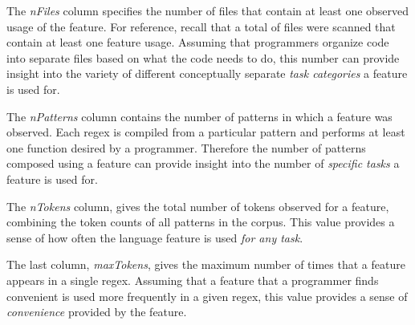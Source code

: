 The \emph{nFiles} column specifies the number of files that contain at least one observed usage of the feature.  For reference, recall that a total of  files were scanned that contain at least one feature usage.  Assuming that programmers organize code into separate files based on what the code needs to do, this number can provide insight into the variety of different conceptually separate \emph{task categories} a feature is used for.

The \emph{nPatterns} column contains the number of patterns in which a feature was observed. Each regex is compiled from a particular pattern and performs at least one function desired by a programmer.  Therefore the number of patterns composed using a feature can provide insight into the number of \emph{specific tasks} a feature is used for.

The \emph{nTokens} column, gives the total number of tokens observed for a feature, combining the token counts of all patterns in the corpus.  This value provides a sense of how often the language feature is used \emph{for any task}.

The last column, \emph{maxTokens}, gives the maximum number of times that a feature appears in a single regex.  Assuming that a feature that a programmer finds convenient is used more frequently in a given regex, this value provides a sense of \emph{convenience} provided by the feature.
